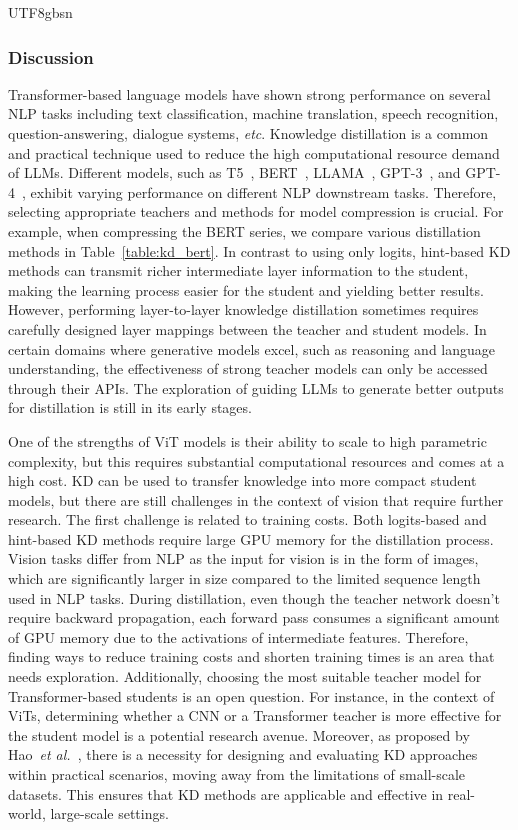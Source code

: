 \documentclass[10pt,journal,compsoc]{IEEEtran}
\newcommand{\etal}{\emph{et al.}}
\newcommand{\etc}{\emph{etc}}
\newcommand{\<}{\left\langle}
\renewcommand{\>}{\right\rangle}
\newcommand{\1}{\mathbbm{1}}
\begin{document}
\begin{CJK}{UTF8}{gbsn}
\subsubsection{Discussion}

Transformer-based language models have shown strong performance on several NLP tasks including text classification, machine translation, speech recognition, question-answering, dialogue systems, \etc. Knowledge distillation is a common and practical technique used to reduce the high computational resource demand of LLMs. Different models, such as T5~\cite{raffel2020exploring}, BERT~\cite{devlin2018bert}, LLAMA~\cite{touvron2023llama}, GPT-3~\cite{brown2020language}, and GPT-4~\cite{gpt4}, exhibit varying performance on different NLP downstream tasks. Therefore, selecting appropriate teachers and methods for model compression is crucial. For example, when compressing the BERT series, we compare various distillation methods in Table~\ref{table:kd_bert}. In contrast to using only logits, hint-based KD methods can transmit richer intermediate layer information to the student, making the learning process easier for the student and yielding better results. However, performing layer-to-layer knowledge distillation sometimes requires carefully designed layer mappings between the teacher and student models. In certain domains where generative models excel, such as reasoning and language understanding, the effectiveness of strong teacher models can only be accessed through their APIs. The exploration of guiding LLMs to generate better outputs for distillation is still in its early stages.

One of the strengths of ViT models is their ability to scale to high parametric complexity, but this requires substantial computational resources and comes at a high cost. KD can be used to transfer knowledge into more compact student models, but there are still challenges in the context of vision that require further research.
The first challenge is related to training costs. Both logits-based and hint-based KD methods require large GPU memory for the distillation process. Vision tasks differ from NLP as the input for vision is in the form of images, which are significantly larger in size compared to the limited sequence length used in NLP tasks. During distillation, even though the teacher network doesn't require backward propagation, each forward pass consumes a significant amount of GPU memory due to the activations of intermediate features. Therefore, finding ways to reduce training costs and shorten training times is an area that needs exploration.
Additionally, choosing the most suitable teacher model for Transformer-based students is an open question. For instance, in the context of ViTs, determining whether a CNN or a Transformer teacher is more effective for the student model is a potential research avenue.
Moreover, as proposed by Hao~\etal~\cite{hao2023vanillakd}, there is a necessity for designing and evaluating KD approaches within practical scenarios, moving away from the limitations of small-scale datasets. This ensures that KD methods are applicable and effective in real-world, large-scale settings.






\end{CJK}
\end{document}
